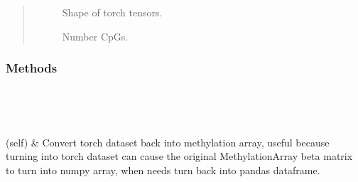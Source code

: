 \documentclass[letterpaper,10pt,english]{sphinxmanual}
\begin{document}
\begin{fulllineitems}
\begin{quote}
\begin{description}
\begin{description}
\item[{}] \leavevmode
Shape of torch tensors.

\item[{}] \leavevmode
Number CpGs.

\item[{}] \leavevmode
\item[{}] \leavevmode
\item[{}] \leavevmode
\end{description}

\end{description}\end{quote}
\subsubsection*{Methods}


\begin{savenotes}\sphinxatlongtablestart\begin{longtable}{}
\hline

\endfirsthead

%
{}\\
\hline

\endhead

\hline
{}\\
\endfoot

\endlastfoot

(self)
&
Convert torch dataset back into methylation array, useful because turning into torch dataset can cause the original MethylationArray beta matrix to turn into numpy array, when needs turn back into pandas dataframe.
\\
\hline
\end{longtable}\sphinxatlongtableend\end{savenotes}

\end{fulllineitems}

\end{document}
